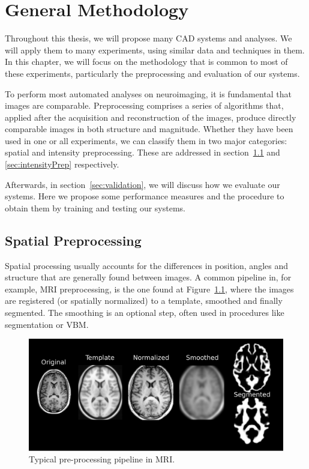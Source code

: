\chapter{General Methodology}\label{ch:preprocessing} %
Throughout this thesis, we will propose many \ac{CAD} systems and analyses. We will apply them to many experiments, using similar data and techniques in them. In this chapter, we will focus on the methodology that is common to most of these experiments, particularly the preprocessing and evaluation of our systems. 

To perform most automated analyses on neuroimaging, it is fundamental that images are comparable. Preprocessing comprises a series of algorithms that, applied after the acquisition and reconstruction of the images, produce directly comparable images in both structure and magnitude. Whether they have been used in one or all experiments, we can classify them in two major categories: spatial and intensity preprocessing. These are addressed in section~\ref{sec:spatial} and \ref{sec:intensityPrep} respectively. 

Afterwards, in section~\ref{sec:validation}, we will discuss how we evaluate our systems. Here we propose some performance measures and the procedure to obtain them by training and testing our systems.  


\section{Spatial Preprocessing}\label{sec:spatial}
Spatial processing usually accounts for the differences in position, angles and structure that are generally found between images. A common pipeline in, for example, \ac{MRI} preprocessing, is the one found at Figure~\ref{fig:examplePreMRI}, where the images are registered (or spatially normalized) to a template, smoothed and finally segmented. The smoothing is an optional step, often used in procedures like segmentation or \ac{VBM}. 

\begin{figure}[htp]
	\myfloatalign
	\includegraphics[width=.7\linewidth]{Graphics/ch3/preProcessPL}
	\caption[Typical pre-processing pipeline in \acs{MRI}]{Typical pre-processing pipeline in \ac{MRI}.}\label{fig:examplePreMRI}
\end{figure}

